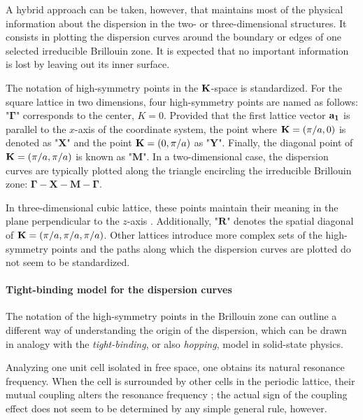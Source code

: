 A hybrid approach can be taken, however, that maintains most of the physical information about the dispersion in the two- or three-dimensional structures. It consists in plotting the  dispersion curves around the boundary or edges of one selected irreducible Brillouin zone. It is expected that no important information is lost by leaving out its inner surface.

The notation of high-symmetry points in the ${\mathbf{K}}$-space is standardized. For the square lattice in two dimensions, four high-symmetry points are named as follows: "$\mathbf{\Gamma}$" corresponds to the center, $K=0$. Provided that the first lattice vector ${\mathbf{a_1}}$ is parallel to the $x$-axis of the coordinate system, the point where ${\mathbf{K}} = (\pi/a, 0)$ is denoted as  "$\mathbf{X}$" and the point ${\mathbf{K}} = (0, \pi/a)$ as "$\mathbf{Y}$". Finally, the diagonal point of ${\mathbf{K}} = (\pi/a, \pi/a)$ is known as "$\mathbf{M}$".
In a two-dimensional case, the dispersion curves are typically plotted along the triangle encircling the irreducible Brillouin zone: $\mathbf{\Gamma}-\mathbf{X}-\mathbf{M}-\mathbf{\Gamma}$.

In three-dimensional cubic lattice, these points maintain their meaning in the plane perpendicular to the $z$-axis \cite[p. 99]{klingshirn2007semiconductor}. Additionally, "$\mathbf{R}$" denotes the spatial diagonal of ${\mathbf{K}} = (\pi/a, \pi/a, \pi/a)$. Other lattices introduce more complex sets of the high-symmetry points and the paths along which the dispersion curves are plotted do not seem to be standardized.

\paragraph{Tight-binding model for the dispersion curves} %
The notation of the high-symmetry points in the Brillouin zone can outline a different way \cite{shi2007} of understanding the origin of the dispersion, which can be drawn in analogy with the \textit{tight-binding},   %
or also \textit{hopping},  %
model in solid-state physics. 

\label{tight-binding}
Analyzing one unit cell isolated in free space, one obtains its natural resonance frequency.  When the cell is surrounded by other cells in the periodic lattice, their mutual coupling alters the resonance frequency \cite[p. 75]{klingshirn2007semiconductor}; the actual sign of the coupling effect does not seem to be determined by any simple general rule, however.	

